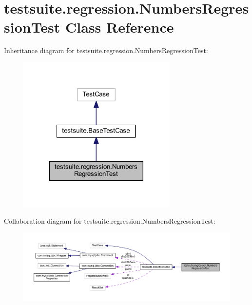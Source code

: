 \hypertarget{classtestsuite_1_1regression_1_1_numbers_regression_test}{}\section{testsuite.\+regression.\+Numbers\+Regression\+Test Class Reference}
\label{classtestsuite_1_1regression_1_1_numbers_regression_test}


Inheritance diagram for testsuite.\+regression.\+Numbers\+Regression\+Test\+:
\nopagebreak
\begin{figure}[H]
\begin{center}
\leavevmode
\includegraphics[width=224pt]{classtestsuite_1_1regression_1_1_numbers_regression_test__inherit__graph}
\end{center}
\end{figure}


Collaboration diagram for testsuite.\+regression.\+Numbers\+Regression\+Test\+:
\nopagebreak
\begin{figure}[H]
\begin{center}
\leavevmode
\includegraphics[width=350pt]{classtestsuite_1_1regression_1_1_numbers_regression_test__coll__graph}
\end{center}
\end{figure}
